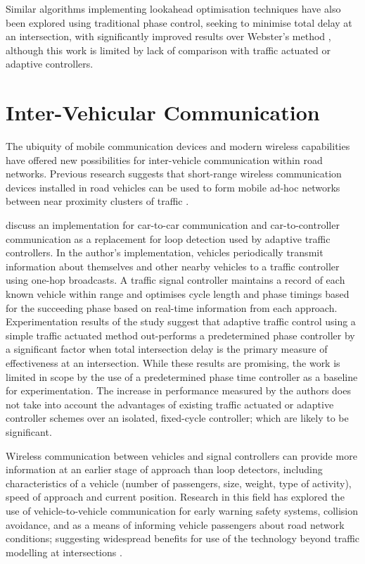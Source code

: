 Similar algorithms implementing lookahead optimisation techniques have also been explored using traditional phase control, seeking to minimise total delay at an intersection, with significantly improved results over Webster's method \cite{porche1996allonsd}, although this work is limited by lack of comparison with traffic actuated or adaptive controllers. 


\section{Inter-Vehicular Communication}

The ubiquity of mobile communication devices and modern wireless capabilities have offered new possibilities for inter-vehicle communication within road networks. Previous research suggests that short-range wireless communication devices installed in road vehicles can be used to form mobile ad-hoc networks between near proximity clusters of traffic \cite{adaptive2007grad,nadeem2004trafficview,yang2004vehicle}.

 discuss an implementation for car-to-car communication and car-to-controller communication as a replacement for loop detection used by adaptive traffic controllers. In the author's implementation, vehicles periodically transmit information about themselves and other nearby vehicles to a traffic controller using one-hop broadcasts. A traffic signal controller maintains a record of each known vehicle within range and optimises cycle length and phase timings based for the succeeding phase based on real-time information from each approach. Experimentation results of the study suggest that adaptive traffic control using a simple traffic actuated method out-performs a predetermined phase controller by a significant factor when total intersection delay is the primary measure of effectiveness at an intersection. While these results are promising, the work is limited in scope by the use of a predetermined phase time controller as a baseline for experimentation. The increase in performance measured by the authors does not take into account the advantages of existing traffic actuated or adaptive controller schemes over an isolated, fixed-cycle controller; which are likely to be significant. 

Wireless communication between vehicles and signal controllers can provide more information at an earlier stage of approach than loop detectors, including characteristics of a vehicle (number of passengers, size, weight, type of activity), speed of approach and current position. Research in this field has explored the use of vehicle-to-vehicle communication for early warning safety systems, collision avoidance, and as a means of informing vehicle passengers about road network conditions; suggesting widespread benefits for use of the technology beyond traffic modelling at intersections \cite{nadeem2004trafficview,yang2004vehicle}.

